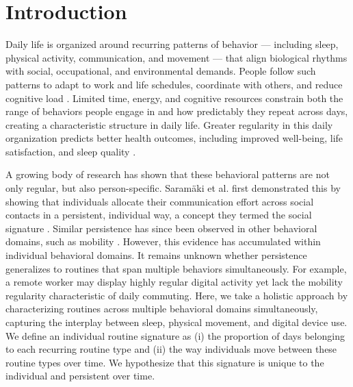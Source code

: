 \documentclass[pdflatex,sn-vancouver,Numbered]{bst/sn-jnl}%
\theoremstyle{thmstyleone}%
\theoremstyle{thmstyletwo}%
\theoremstyle{thmstylethree}%
\begin{document}

\maketitle

\section{Introduction}\label{sec1}

Daily life is organized around recurring patterns of behavior — including sleep, physical activity, communication, and movement — that align biological rhythms with social, occupational, and environmental demands. People follow such patterns to adapt to work and life schedules, coordinate with others, and reduce cognitive load \cite{monk1994regularity}. Limited time, energy, and cognitive resources constrain both the range of behaviors people engage in and how predictably they repeat across days, creating a characteristic structure in daily life. Greater regularity in this daily organization predicts better health outcomes, including improved well-being, life satisfaction, and sleep quality \cite{heintzelman2019routines, margraf2016social, carney2006daily}. 

A growing body of research has shown that these behavioral patterns are not only regular, but also person-specific. Saramäki et al. first demonstrated this by showing that individuals allocate their communication effort across social contacts in a persistent, individual way, a concept they termed the social signature \cite{saramaki2014persistence}. Similar persistence has since been observed in other behavioral domains, such as mobility \cite{alessandretti2020scales}.  However, this evidence has accumulated within individual behavioral domains. It remains unknown whether persistence generalizes to routines that span multiple behaviors simultaneously. For example, a remote worker may display highly regular digital activity yet lack the mobility regularity characteristic of daily commuting. Here, we take a holistic approach by characterizing routines across multiple behavioral domains simultaneously, capturing the interplay between sleep, physical movement, and digital device use. We define an individual routine signature as (i) the proportion of days belonging to each recurring routine type and (ii) the way individuals move between these routine types over time. We hypothesize that this signature is unique to the individual and persistent over time.
\end{document}
